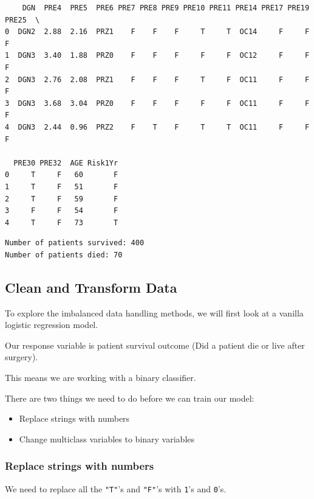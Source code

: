 \documentclass[11pt]{article}
\providecommand{\tightlist}{%
      \setlength{\itemsep}{0pt}\setlength{\parskip}{0pt}}
\begin{document}
    
    \begin{verbatim}
    DGN  PRE4  PRE5  PRE6 PRE7 PRE8 PRE9 PRE10 PRE11 PRE14 PRE17 PRE19 PRE25  \
0  DGN2  2.88  2.16  PRZ1    F    F    F     T     T  OC14     F     F     F   
1  DGN3  3.40  1.88  PRZ0    F    F    F     F     F  OC12     F     F     F   
2  DGN3  2.76  2.08  PRZ1    F    F    F     T     F  OC11     F     F     F   
3  DGN3  3.68  3.04  PRZ0    F    F    F     F     F  OC11     F     F     F   
4  DGN3  2.44  0.96  PRZ2    F    T    F     T     T  OC11     F     F     F   

  PRE30 PRE32  AGE Risk1Yr  
0     T     F   60       F  
1     T     F   51       F  
2     T     F   59       F  
3     F     F   54       F  
4     T     F   73       T  
    \end{verbatim}

    
    \begin{Verbatim}[commandchars=\\\{\}]
Number of patients survived: 400
Number of patients died: 70

    \end{Verbatim}

    \subsection{Clean and Transform Data}\label{clean-and-transform-data}

To explore the imbalanced data handling methods, we will first look at a
vanilla logistic regression model.

Our response variable is patient survival outcome (Did a patient die or
live after surgery).

This means we are working with a binary classifier.

There are two things we need to do before we can train our model:

\begin{itemize}
\tightlist
\item
  Replace strings with numbers
\item
  Change multiclass variables to binary variables
\end{itemize}

    \subsubsection{Replace strings with
numbers}\label{replace-strings-with-numbers}

We need to replace all the \texttt{"T"}'s and \texttt{"F"}'s with
\texttt{1}'s and \texttt{0}'s.
\end{document}
